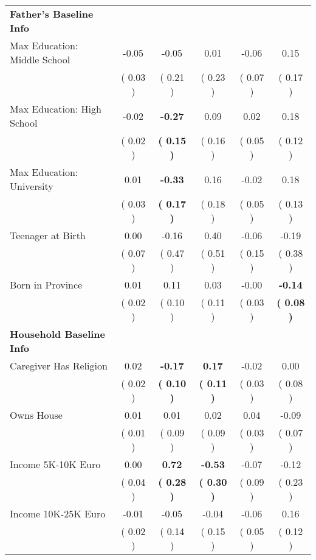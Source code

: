 \begin{table}[H]
{\begin{tabular}{lccccc}
\midrule
\textbf{Father's Baseline Info} \\
\quad Max Education: Middle School &     -0.05 &     -0.05 &      0.01 &     -0.06 &      0.15 \\
\quad  & (     0.03 ) & (     0.21 )  & (     0.23 )  & (     0.07 ) & (     0.17 ) \\
\quad Max Education: High School &     -0.02 & \textbf{    -0.27} &      0.09 &      0.02 &      0.18 \\
\quad  & (     0.02 ) & \textbf{(     0.15 )}  & (     0.16 )  & (     0.05 ) & (     0.12 ) \\
\quad Max Education: University &      0.01 & \textbf{    -0.33} &      0.16 &     -0.02 &      0.18 \\
\quad  & (     0.03 ) & \textbf{(     0.17 )}  & (     0.18 )  & (     0.05 ) & (     0.13 ) \\
\quad Teenager at Birth &      0.00 &     -0.16 &      0.40 &     -0.06 &     -0.19 \\
\quad  & (     0.07 ) & (     0.47 )  & (     0.51 )  & (     0.15 ) & (     0.38 ) \\
\quad Born in Province &      0.01 &      0.11 &      0.03 &     -0.00 & \textbf{    -0.14} \\
\quad  & (     0.02 ) & (     0.10 )  & (     0.11 )  & (     0.03 ) & \textbf{(     0.08 )} \\
\midrule
\textbf{Household Baseline Info} \\
\quad Caregiver Has Religion &      0.02 & \textbf{    -0.17} & \textbf{     0.17} &     -0.02 &      0.00 \\
\quad  & (     0.02 ) & \textbf{(     0.10 )}  & \textbf{(     0.11 )}  & (     0.03 ) & (     0.08 ) \\
\quad Owns House &      0.01 &      0.01 &      0.02 &      0.04 &     -0.09 \\
\quad  & (     0.01 ) & (     0.09 )  & (     0.09 )  & (     0.03 ) & (     0.07 ) \\
\quad Income 5K-10K Euro &      0.00 & \textbf{     0.72} & \textbf{    -0.53} &     -0.07 &     -0.12 \\
\quad  & (     0.04 ) & \textbf{(     0.28 )}  & \textbf{(     0.30 )}  & (     0.09 ) & (     0.23 ) \\
\quad Income 10K-25K Euro &     -0.01 &     -0.05 &     -0.04 &     -0.06 &      0.16 \\
\quad  & (     0.02 ) & (     0.14 )  & (     0.15 )  & (     0.05 ) & (     0.12 ) \\

\end{tabular}}
\end{table}
